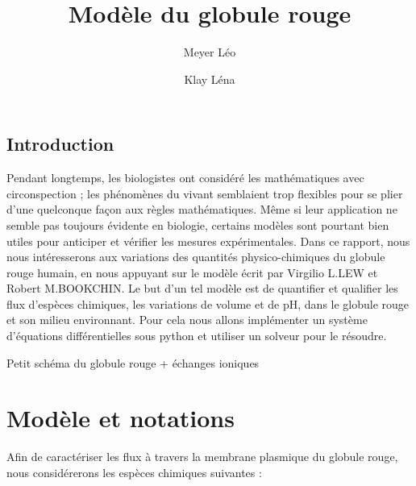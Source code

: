 \documentclass[a4paper,fleqn]{article}
\title{Modèle du globule rouge}           %
\author{Meyer Léo \and Klay Léna}
\date{}                       %
\begin{document}
\maketitle                    %


\subsection*{Introduction}

Pendant longtemps, les biologistes ont considéré les mathématiques avec circonspection ; les
phénomènes du vivant semblaient trop flexibles pour se plier d'une quelconque façon
aux règles mathématiques. Même si leur application ne semble pas toujours évidente en biologie, certains modèles sont pourtant bien utiles pour anticiper et vérifier les mesures expérimentales. Dans ce rapport, nous nous intéresserons aux variations des quantités physico-chimiques  du globule rouge humain, en nous appuyant sur le modèle écrit par Virgilio L.LEW et Robert M.BOOKCHIN. Le but d'un tel modèle est de quantifier et qualifier les flux d'espèces chimiques, les variations de volume et de pH, dans le globule rouge et son milieu environnant. Pour cela nous allons implémenter un système d'équations différentielles sous python et utiliser un solveur pour le résoudre.

Petit schéma du globule rouge + échanges ioniques




\tableofcontents              %


\section{Modèle et notations}               %

Afin de caractériser les flux à travers la membrane plasmique du globule rouge, nous considérerons les espèces chimiques suivantes :
\end{document}
